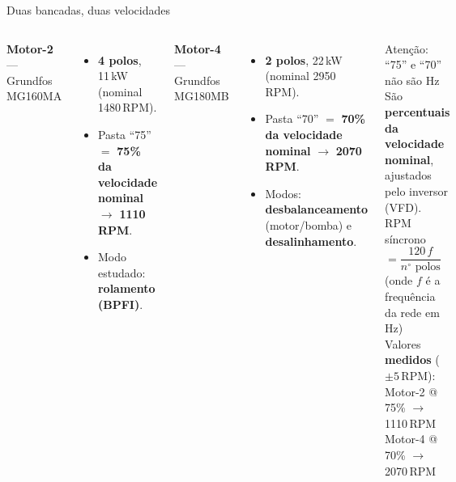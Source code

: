 \documentclass{beamer}
\begin{document}
\begin{frame}{Duas bancadas, duas velocidades}
    \begin{columns}
        \footnotesize
        \textbf{Motor-2} --- Grundfos MG160MA
        \begin{itemize}
            \item \textbf{4 polos}, 11\,kW (nominal 1480\,RPM).
            \item Pasta ``75'' $=$ \textbf{75\% da velocidade nominal} $\rightarrow$ \textbf{1110\,RPM}.
            \item Modo estudado: \textbf{rolamento (BPFI)}.
        \end{itemize}
        \vspace{0.2cm}
        \textbf{Motor-4} --- Grundfos MG180MB
        \begin{itemize}
            \item \textbf{2 polos}, 22\,kW (nominal 2950\,RPM).
            \item Pasta ``70'' $=$ \textbf{70\% da velocidade nominal} $\rightarrow$ \textbf{2070\,RPM}.
            \item Modos: \textbf{desbalanceamento} (motor/bomba) e \textbf{desalinhamento}.
        \end{itemize}
        \begin{block}{Atenção: ``75'' e ``70'' não são Hz}
            \footnotesize São \textbf{percentuais da velocidade nominal}, ajustados pelo inversor (VFD).\\[4pt]
            RPM síncrono $= \dfrac{120\,f}{n^\circ\text{ polos}}$ (onde $f$ é a frequência da rede em Hz)\\[4pt]
            Valores \textbf{medidos} ($\pm 5$\,RPM):\\
            Motor-2 @ 75\% $\rightarrow$ 1110\,RPM\\
            Motor-4 @ 70\% $\rightarrow$ 2070\,RPM
        \end{block}
    \end{columns}
\end{frame}
\end{document}
